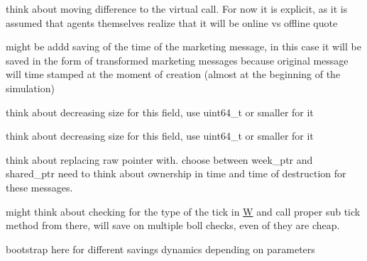 \begin{DoxyRefList}
think about moving difference to the virtual call. For now it is explicit, as it is assumed that agents themselves realize that it will be online vs offline quote  
\item[\label{_dev_stage2__DevStage2000001}%
\hypertarget{_dev_stage2__DevStage2000001}{}%
Member \hyperlink{classsolar__core_1_1_household_ac9d26af7b52f0cdc357fc5dca4b86ad9}{solar\+\_\+core\+:\+:Household\+:\+:get\+\_\+inf} (std\+::shared\+\_\+ptr$<$ Mes\+Marketing\+S\+E\+I $>$ mes\+\_\+) override]might be addd saving of the time of the marketing message, in this case it will be saved in the form of transformed marketing messages because original message will time stamped at the moment of creation (almost at the beginning of the simulation)  
\item[\label{_dev_stage2__DevStage2000007}%
\hypertarget{_dev_stage2__DevStage2000007}{}%
Member \hyperlink{classsolar__core_1_1_household_a1104d8264fe733937e1fd2e9ad0f8fc1}{solar\+\_\+core\+:\+:Household\+:\+:house} ]think about decreasing size for this field, use uint64\+\_\+t or smaller for it  
\item[\label{_dev_stage2__DevStage2000006}%
\hypertarget{_dev_stage2__DevStage2000006}{}%
Member \hyperlink{classsolar__core_1_1_household_a1ba6b7af82982096e05d99a70a2647eb}{solar\+\_\+core\+:\+:Household\+:\+:location\+\_\+y} ]think about decreasing size for this field, use uint64\+\_\+t or smaller for it  
\item[\label{_dev_stage2__DevStage2000008}%
\hypertarget{_dev_stage2__DevStage2000008}{}%
Member \hyperlink{classsolar__core_1_1_household_a297842358a2d79db160566106972bc0d}{solar\+\_\+core\+:\+:Household\+:\+:preliminary\+\_\+quotes} ]think about replacing raw pointer with.  choose between week\+\_\+ptr and shared\+\_\+ptr need to think about ownership in time and time of destruction for these messages.  
\item[\label{_dev_stage2__DevStage2000010}%
\hypertarget{_dev_stage2__DevStage2000010}{}%
Member \hyperlink{classsolar__core_1_1_s_e_i_ab0bd6ae650afc15fe71ce545373ab16e}{solar\+\_\+core\+:\+:S\+E\+I\+:\+:act\+\_\+tick} ()]might think about checking for the type of the tick in \hyperlink{classsolar__core_1_1_w}{W} and call proper sub tick method from there, will save on multiple boll checks, even of they are cheap.  
\item[\label{_dev_stage2__DevStage2000009}%
\hypertarget{_dev_stage2__DevStage2000009}{}%
Member \hyperlink{classsolar__core_1_1_s_e_i_a807561ad055ddc0df91b80ba406ee6df}{solar\+\_\+core\+:\+:S\+E\+I\+:\+:form\+\_\+design} (std\+::shared\+\_\+ptr$<$ P\+V\+Project $>$ project\+\_\+)]bootstrap here for different savings dynamics depending on parameters  

\end{DoxyRefList}
